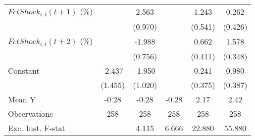 {\begin{tabular}{l*{5}{c}}
\addlinespace
$ FctShock_{i,t}(t+1)$ (\%)&                     &       2.563\sym{**} &                     &       1.243\sym{**} &       0.262         \\
                    &                     &     (0.970)         &                     &     (0.541)         &     (0.426)         \\
\addlinespace
$ FctShock_{i,t}(t+2)$ (\%)&                     &      -1.988\sym{**} &                     &       0.662         &       1.578\sym{***}\\
                    &                     &     (0.756)         &                     &     (0.411)         &     (0.348)         \\
\addlinespace
Constant            &      -2.437         &      -1.950\sym{*}  &                     &       0.241         &       0.980\sym{**} \\
                    &     (1.455)         &     (1.020)         &                     &     (0.375)         &     (0.387)         \\
\midrule
Mean Y              &       -0.28         &       -0.28         &       -0.28         &        2.17         &        2.42         \\
Observations        &         258         &         258         &         258         &         258         &         258         \\
Exc. Inst. F-stat   &                     &       4.115         &       6.666         &      22.880         &      55.880         \\
\bottomrule
\end{tabular}
}
